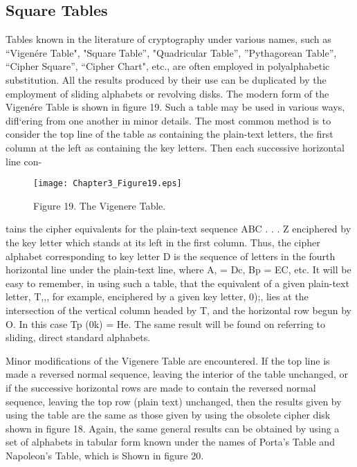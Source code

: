 \subsection{Square Tables}

\mypara Tables known in the literature of cryptography under various
names, such as “Vigenére Table", "Square Table”, "Quadricular Table”,
”Pythagorean Table”, “Cipher Square”, “Cipher Chart", etc., are often
employed in polyalphabetic substitution. All the results produced by their
use can be duplicated by the employment of sliding alphabets or revolving disks. The modern form of the Vigenére Table is shown in ﬁgure 19.
Such a table may be used in various ways, diﬂ‘ering from one another in
minor details. The most common method is to consider the top line of
the table as containing the plain-text letters, the ﬁrst column at the left
as containing the key letters. Then each successive horizontal line con-

\begin{figure}[h]
 \centering
 \texttt{[image: Chapter3\_Figure19.eps]}
 \caption{Figure 19. The Vigenere Table.}
\end{figure}

 

tains the cipher equivalents for the plain-text sequence ABC . . . Z enciphered by the key letter which stands at its left in the ﬁrst column.
Thus, the cipher alphabet corresponding to key letter D is the sequence
of letters in the fourth horizontal line under the plain-text line, where
A, = Dc, Bp = EC, etc. It will be easy to remember, in using such a
table, that the equivalent of a given plain-text letter, T,,, for example,
enciphered by a given key letter, 0);, lies at the intersection of the vertical
column headed by T, and the horizontal row begun by O. In this case
Tp (0k) = He. The same result will be found on referring to sliding,
direct standard alphabets.

\mypara Minor modiﬁcations of the Vigenere Table are encountered. If the
top line is made a reversed normal sequence, leaving the interior of the
table unchanged, or if the successive horizontal rows are made to contain
the reversed normal sequence, leaving the top row (plain text) unchanged, then the results given by using the table are the same as those
given by using the obsolete cipher disk shown in ﬁgure 18. Again, the
same general results can be obtained by using a set of alphabets in tabular form known under the names of Porta’s Table and Napoleon’s Table,
which is Shown in ﬁgure 20.

